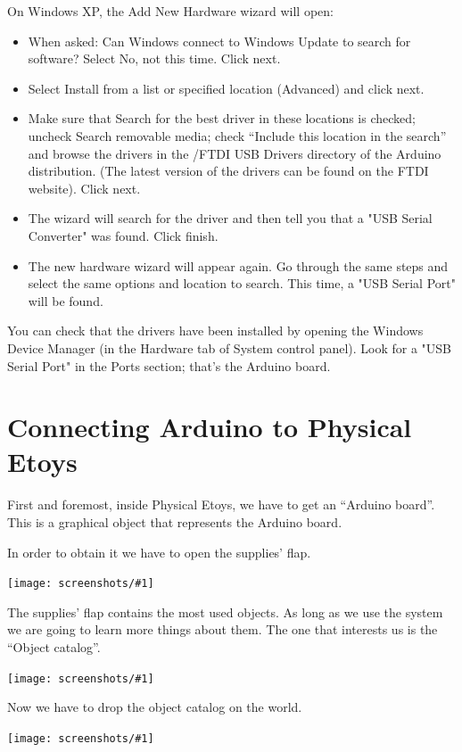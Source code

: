 \documentclass[a4paper,12pt]{article}
\newcommand{\screenshot}[1]
{
\begin{center}
	\texttt{[image: screenshots/\#1]}
\end{center}
}
\begin{document}
On Windows XP, the Add New Hardware wizard will open:

\begin{itemize}
	\item When asked: Can Windows connect to Windows Update to search for software? Select No, not this time. Click next.
	\item Select Install from a list or specified location (Advanced) and click next.
	\item Make sure that Search for the best driver in these locations is checked; uncheck Search removable media; check “Include this location in the search” and browse the drivers in the /FTDI USB Drivers directory of the Arduino distribution. (The latest version of the drivers can be found on the FTDI website). Click next.
	\item The wizard will search for the driver and then tell you that a "USB Serial Converter" was found. Click finish.
	\item The new hardware wizard will appear again. Go through the same steps and select the same options and location to search. This time, a "USB Serial Port" will be found.
\end{itemize}

You can check that the drivers have been installed by opening the Windows Device Manager (in the Hardware tab of System control panel). Look for a "USB Serial Port" in the Ports section; that's the Arduino board.


\section{Connecting Arduino to Physical Etoys}

First and foremost, inside Physical Etoys, we have to get an “Arduino board”. This is a graphical object that represents the Arduino board. 

In order to obtain it we have to open the supplies’ flap.

\screenshot{01.png}

The supplies’ flap contains the most used objects.  As long as we use the system we are going to learn more things about them. The one that interests us is the “Object catalog”.

\screenshot{02.png}

Now we have to drop the object catalog on the world. 

\screenshot{03.png}
\end{document}
